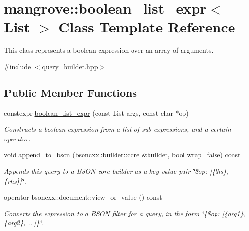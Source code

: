 \hypertarget{classmangrove_1_1boolean__list__expr}{}\section{mangrove\+:\+:boolean\+\_\+list\+\_\+expr$<$ List $>$ Class Template Reference}
\label{classmangrove_1_1boolean__list__expr}


This class represents a boolean expression over an array of arguments.  




{\ttfamily \#include $<$query\+\_\+builder.\+hpp$>$}

\subsection*{Public Member Functions}
\begin{DoxyCompactItemize}
\item 
constexpr \hyperlink{classmangrove_1_1boolean__list__expr_a77c13709826f8381f4b8da4ef127c45c}{boolean\+\_\+list\+\_\+expr} (const List args, const char $\ast$op)
\begin{DoxyCompactList}\small\item\em Constructs a boolean expression from a list of sub-\/expressions, and a certain operator. \end{DoxyCompactList}\item 
void \hyperlink{classmangrove_1_1boolean__list__expr_a75f8fbf2d2c078dd1c211e895c7949db}{append\+\_\+to\+\_\+bson} (bsoncxx\+::builder\+::core \&builder, bool wrap=false) const 
\begin{DoxyCompactList}\small\item\em Appends this query to a B\+S\+ON core builder as a key-\/value pair \char`\"{}\$op\+: \mbox{[}\{lhs\}, \{rhs\}\mbox{]}\char`\"{}. \end{DoxyCompactList}\item 
\hyperlink{classmangrove_1_1boolean__list__expr_aab12e391dd1a0bf8ae2398f9eb277399}{operator bsoncxx\+::document\+::view\+\_\+or\+\_\+value} () const \hypertarget{classmangrove_1_1boolean__list__expr_aab12e391dd1a0bf8ae2398f9eb277399}{}\label{classmangrove_1_1boolean__list__expr_aab12e391dd1a0bf8ae2398f9eb277399}

\begin{DoxyCompactList}\small\item\em Converts the expression to a B\+S\+ON filter for a query, in the form \char`\"{}\{\$op\+: \mbox{[}\{arg1\}, \{arg2\}, ...\mbox{]}\}\char`\"{}. \end{DoxyCompactList}\end{DoxyCompactItemize}


